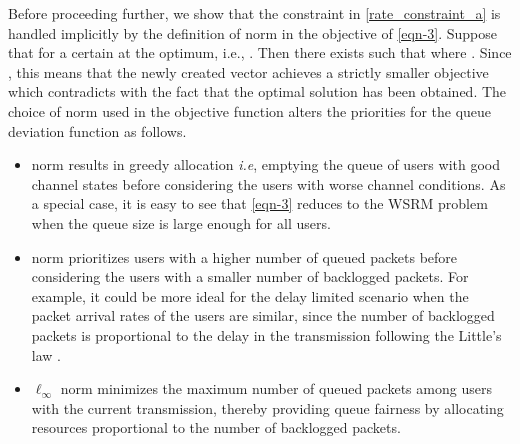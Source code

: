 Before proceeding further, we show that the constraint in \eqref{rate_constraint_a} is handled implicitly by the definition of  norm in the objective of \eqref{eqn-3}. Suppose that  for a certain  at the optimum, i.e., . Then there exists  such that  where . Since , this means that the newly created vector  achieves a strictly smaller objective which contradicts with the fact that the optimal solution has been obtained. The choice of  norm used in the objective function \cite{berry2004cross,qps_cioffi} alters the priorities for the queue deviation function as follows.
\begin{itemize}
\item {} norm results in greedy allocation \textit{i.e}, emptying the queue of users with good channel states before considering the users with worse channel conditions. As a special case, it is easy to see that \eqref{eqn-3} reduces to the \ac{WSRM} problem when the queue size is large enough for all users.
\item {} norm prioritizes users with a higher number of queued packets before considering the users with a smaller number of backlogged packets. For example, it could be more ideal for the delay limited scenario when the packet arrival rates of the users are similar, since the number of backlogged packets is proportional to the delay in the transmission following the Little's law \cite{neely2010stochastic}.
\item \(\ell_{\infty} \) norm minimizes the maximum number of queued packets among users with the current transmission, thereby providing queue fairness by allocating resources proportional to the number of backlogged packets.
\end{itemize} 